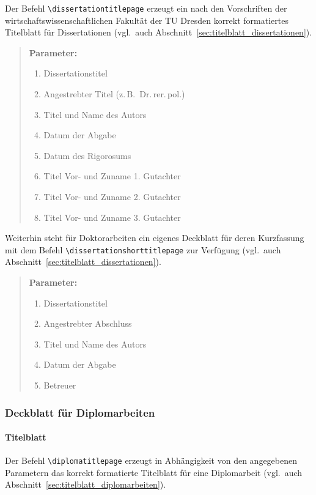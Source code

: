 \documentclass[english, trackchanges, hyperref, ngerman ,pdf, mp, mppdf]{wise}
\newcommand\code[1]{\texttt{#1}}
\newcommand\command[1]{\code{\textbackslash{}#1}}
\begin{document}
Der Befehl \command{dissertationtitlepage} erzeugt
ein nach den Vorschriften der wirtschaftswissenschaftlichen Fakultät
der TU Dresden korrekt formatiertes Titelblatt für Dissertationen
(vgl.\ auch Abschnitt~\ref{sec:titelblatt_dissertationen}).

\begin{quotation}
\noindent \textbf{Parameter:}
\begin{enumerate}
\item Dissertationstitel
\item Angestrebter Titel (z.\,B.\ Dr.\,rer.\,pol.)
\item Titel und Name des Autors
\item Datum der Abgabe
\item Datum des Rigorosums
\item Titel Vor- und Zuname 1. Gutachter
\item Titel Vor- und Zuname 2. Gutachter
\item Titel Vor- und Zuname 3. Gutachter
\end{enumerate}
\end{quotation}
Weiterhin steht für Doktorarbeiten ein eigenes Deckblatt für deren
Kurzfassung mit dem Befehl \command{dissertationshorttitlepage}
zur Verfügung (vgl.\ auch Abschnitt~\ref{sec:titelblatt_dissertationen}).

\begin{quotation}
\noindent \textbf{Parameter:}
\begin{enumerate}
\item Dissertationstitel
\item Angestrebter Abschluss
\item Titel und Name des Autors
\item Datum der Abgabe
\item Betreuer
\end{enumerate}
\end{quotation}

\subsubsection{Deckblatt für Diplomarbeiten}


\paragraph{Titelblatt}

Der Befehl \command{diplomatitlepage} erzeugt in Abhängigkeit
von den angegebenen Parametern das korrekt formatierte Titelblatt
für eine Diplomarbeit (vgl.\ auch Abschnitt~\ref{sec:titelblatt_diplomarbeiten}).
\end{document}
